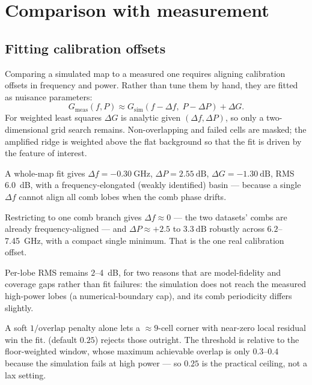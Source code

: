 \section{Comparison with measurement}

\subsection{Fitting calibration offsets}

Comparing a simulated map to a measured one requires aligning calibration
offsets in frequency and power. Rather than tune them by hand, they are fitted
as nuisance parameters:
\begin{equation}
  G_{\mathrm{meas}}(f,P) \approx
  G_{\mathrm{sim}}(f - \Delta f,\; P - \Delta P) + \Delta G .
  \label{eq:map-alignment}
\end{equation}
For weighted least squares $\Delta G$ is analytic given $(\Delta f,\Delta P)$, so
only a two-dimensional grid search remains. Non-overlapping and failed cells are
masked; the amplified ridge is weighted above the flat background so that the
fit is driven by the feature of interest.

\begin{measured}
A whole-map fit gives $\Delta f = \SI{-0.30}{\giga\hertz}$,
$\Delta P = \SI{+2.55}{\dB}$, $\Delta G = \SI{-1.30}{\dB}$, RMS \SI{6.0}{\dB},
with a frequency-elongated (weakly identified) basin --- because a single
$\Delta f$ cannot align all comb lobes when the comb phase drifts.

Restricting to one comb branch gives $\Delta f \approx 0$ --- the two datasets'
combs are already frequency-aligned --- and
$\Delta P \approx +2.5$ to $\SI{+3.3}{\dB}$ robustly across
$6.2$--\SI{7.45}{\giga\hertz}, with a compact single minimum. That is the one
real calibration offset.
\end{measured}

Per-lobe RMS remains $2$--\SI{4}{\dB}, for two reasons that are model-fidelity
and coverage gaps rather than fit failures: the simulation does not reach the
measured high-power lobes (a numerical-boundary cap), and its comb periodicity
differs slightly.

\begin{implnote}
A soft $1/\text{overlap}$ penalty alone lets a $\approx9$-cell corner with
near-zero local residual win the fit.  (default $0.25$)
rejects those outright. The threshold is relative to the floor-weighted window,
whose maximum achievable overlap is only $0.3$--$0.4$ because the simulation
fails at high power --- so $0.25$ is the practical ceiling, not a lax setting.
\end{implnote}

